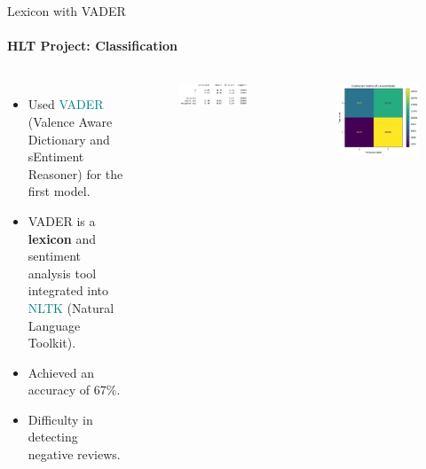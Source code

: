 \documentclass{beamer}
\theoremstyle{definition}
\theoremstyle{plain}
\begin{document}
\begin{frame}{Lexicon with VADER}
\framesubtitle{HLT Project: Classification}

\begin{columns}
    \vspace{-1cm}
    {\small 
        \begin{itemize}
        \item Used \textcolor{teal}{VADER} (Valence Aware Dictionary and sEntiment Reasoner) for the first model.
        \item VADER is a \textbf{lexicon} and sentiment analysis tool integrated into \textcolor{teal}{NLTK} (Natural Language Toolkit).
        \item Achieved an accuracy of 67\%. 
        \item Difficulty in detecting negative reviews.
        \end{itemize}
    }

    \vspace{-0.3cm}
    \begin{figure}
        \centering
        \includegraphics[scale=0.4]{Figures/lexicon_acc.png}
    \end{figure}
    \vspace{-0.3cm}
    \begin{figure}
        \centering
        \includegraphics[scale=0.35]{Figures/Lexicon.png}
    \end{figure}
\end{columns}
\end{frame}
\end{document}
